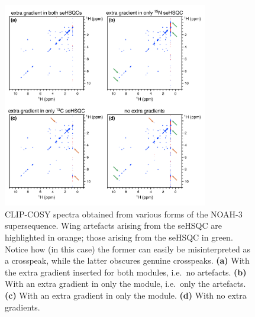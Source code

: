 \begin{figure}
    \centering
    \includegraphics[width=0.8\textwidth]{./figures/wing_artefacts.png}
    \caption{
        CLIP-COSY spectra obtained from various forms of the NOAH-3  supersequence.
        Wing artefacts arising from the \nitrogen{} seHSQC are highlighted in orange; those arising from the \carbon{} seHSQC in green.
        Notice how (in this case) the former can easily be misinterpreted as a crosspeak, while the latter obscures genuine crosspeaks.
        \textbf{(a)} With the extra gradient inserted for both modules, i.e.\ no artefacts.
        \textbf{(b)} With an extra gradient in only the \nitrogen{} module, i.e.\ only the \carbon{} artefacts.
        \textbf{(c)} With an extra gradient in only the \carbon{} module.
        \textbf{(d)} With no extra gradients.
        \grami{}
    }
    \label{fig:wing_artefacts}
\end{figure}

